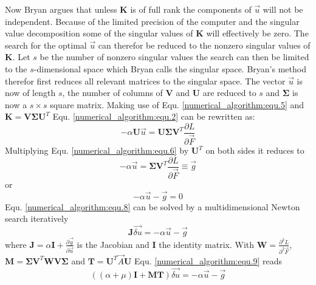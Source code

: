 Now Bryan argues that unless $\mathbf{K}$ is of full rank the components of $\vec u$ will not be independent.
Because of the limited precision of the computer and the singular value decomposition some of the singular values of $\mathbf{K}$ will effectively be zero. The search for the optimal $\vec u$ can therefor be reduced to the nonzero singular values of $\mathbf{K}$. Let $s$ be the number of nonzero singular values the search can then be limited to the $s$-dimensional space which Bryan calls the singular space. 
Bryan's method therefor first reduces all relevant matrices to the singular space. The vector $\vec u$ is now of length $s$, the number of columns of $\mathbf{V}$ and $\mathbf{U}$ are reduced to $s$ and $\mathbf{\Sigma}$ is now a $s \times s$ square matrix. Making use of Equ. \ref{numerical_algorithm:equ.5} and $\mathbf{K} = \mathbf{V} \mathbf{\Sigma} \mathbf{U}^T$ Equ. \ref{numerical_algorithm:equ.2} can be rewritten as:
\begin{equation}
	-\alpha \mathbf{U} \vec u = \mathbf{U} \mathbf{\Sigma} \mathbf{V}^T \frac{\partial L}{\partial \vec F}
	\label{numerical_algorithm:equ.6}
\end{equation}
Multiplying Equ. \ref{numerical_algorithm:equ.6} by $\mathbf{U}^T$ on both sides it reduces to
\begin{equation}
	-\alpha \vec u = \mathbf{\Sigma} \mathbf{V}^T \frac{\partial L}{\partial \vec F} \equiv \vec g 
	\label{numerical_algorithm:equ.7}
\end{equation}
or
\begin{equation}
	-\alpha \vec u - \vec g = 0
	\label{numerical_algorithm:equ.8}
\end{equation}
Equ. \ref{numerical_algorithm:equ.8} can be solved by a multidimensional Newton search iteratively
\begin{equation}
	\mathbf{J} \vec{\delta u} = -\alpha \vec u - \vec g
	\label{numerical_algorithm:equ.9}
\end{equation}
where $\mathbf{J} = \alpha \mathbf{I} + \frac{\partial \vec g}{\partial \vec u}$ is the Jacobian and $\mathbf{I}$ the identity matrix. 
With $\mathbf{W} = \frac{\partial^2 L}{\partial^2 \vec F}$, $\mathbf{M} = \mathbf{\Sigma}\mathbf{V}^T\mathbf{W}\mathbf{V}\mathbf{\Sigma}$ and $\mathbf{T} = \mathbf{U}^T \vec A \mathbf{U}$ Equ. \ref{numerical_algorithm:equ.9} reads
\begin{equation}
	((\alpha + \mu) \mathbf{I} + \mathbf{M}\mathbf{T}) \vec{\delta u} = -\alpha \vec u - \vec g
	\label{numerical_algorithm:equ.10}
\end{equation}
